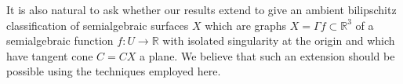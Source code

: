 \documentclass[article]{amsart}
\newcommand{\R}{\mathbb R}
\newcommand{\0}{{\bf 0}}
\begin{document}
It is also natural to ask whether our results extend to give an ambient bilipschitz classification of semialgebraic surfaces $X$ which are graphs $X = \Gamma f \subset \R^3$ of a semialgebraic function $f:U\rightarrow \R$ with isolated singularity at the origin and which have tangent cone $C = CX$ a plane. We believe that such an extension should be possible using the techniques employed here.
 











\end{document}
